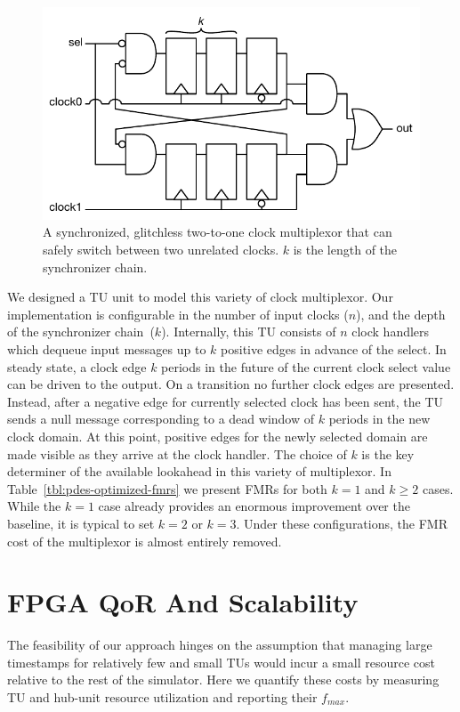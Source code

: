 \begin{figure}
    \centering
    \captionsetup{margin=0.25cm}
    \includegraphics[width=0.6\columnwidth]{figures/clock-mux-sync.pdf}
    \caption{A synchronized, glitchless two-to-one clock multiplexor that can safely switch between two unrelated clocks.
    $k$ is the length of the synchronizer chain.}
    \label{fig:clock-mux-sync}
\end{figure}

We designed a TU unit to model this variety of clock multiplexor. Our
implementation is configurable in the number of input clocks ($n$), and the
depth of the synchronizer chain~($k$). Internally, this TU consists of $n$ clock handlers
which dequeue input messages up to $k$ positive edges in advance of
the select.  In steady state, a clock edge $k$ periods in the future of the
current clock select value can be driven to the output. On a transition no
further clock edges are presented. Instead, after a negative edge for currently
selected clock has been sent, the TU sends a null message corresponding to a
dead window of $k$ periods in the new clock domain. At this point, positive
edges for the newly selected domain are made visible as they arrive at the
clock handler. The choice of $k$ is the key determiner of the available
lookahead in this variety of multiplexor. In Table~\ref{tbl:pdes-optimized-fmrs} we
present FMRs for both $k = 1$ and $k \geq 2$ cases.  While the $k = 1$ case
already provides an enormous improvement over the baseline, it is typical to
set $k = 2$ or $k = 3$.  Under these configurations, the FMR cost of the
multiplexor is almost entirely removed.

\section{FPGA QoR And Scalability}

The feasibility of our approach hinges on the assumption that managing
large timestamps for relatively few and small TUs would incur a small resource
cost relative to the rest of the simulator. Here we quantify these costs by
measuring TU and hub-unit resource utilization and reporting their $f_{max}$.

